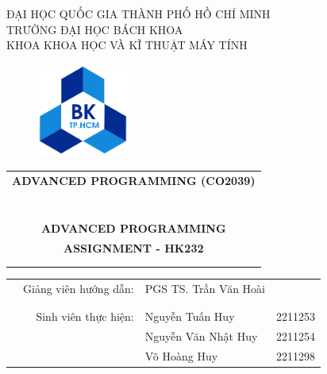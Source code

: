 



\begin{titlepage}
\begin{center}
ĐẠI HỌC QUỐC GIA THÀNH PHỐ HỒ CHÍ MINH \\
TRƯỜNG ĐẠI HỌC BÁCH KHOA \\
KHOA KHOA HỌC VÀ KĨ THUẬT MÁY TÍNH
\end{center}

\vspace{1cm}

\begin{figure}[h!]
\begin{center}
\includegraphics[width=3cm]{Image/hcmut.png}
\end{center}
\end{figure}

\vspace{1cm}


\begin{center}
\begin{tabular}{c}
\multicolumn{1}{l}{\textbf{{\Large ADVANCED PROGRAMMING (CO2039)}}}\\
~~\\
\hline
\\
\\
\textbf{{\Huge ADVANCED PROGRAMMING}}\\
\textbf{{\Huge ASSIGNMENT - HK232}}\\
\\
\\
\hline
\end{tabular}
\end{center}

\vspace{2.5cm}

\begin{table}[h]
	\begin{tabular}{rrlr}
		\hspace{3.5 cm} & Giảng viên hướng dẫn: & PGS TS. Trần Văn Hoài      \\
		\\
		\\
			            & Sinh viên thực hiện: & Nguyễn Tuấn Huy & 2211253 \\
                        &                      & Nguyễn Văn Nhật Huy & 2211254 \\
                        &                      & Võ Hoàng Huy & 2211298 \\
	\end{tabular}
\end{table}


\end{titlepage}
